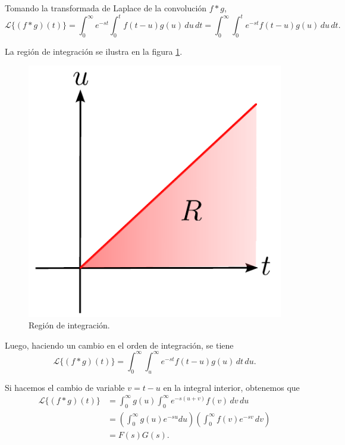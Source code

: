 \begin{demo}

Tomando la transformada de Laplace de la convolución $f * g$,
$$\mathcal{L}\{(f*g)(t)\} = \int_0^{\infty} e^{-st} \int_0^t f(t-u) g(u) \,du \,dt = \int_0^{\infty} \int_0^t e^{-st}  f(t-u) g(u) \,du \,dt.$$

La región de integración se ilustra en la figura \ref{fig:Convolucion2}.

\begin{figure}[H]
    \centering
    \includegraphics[scale = 0.6]{Figuras/Laplace-Convolucion-2.pdf}
    \caption{Región de integración.}
    \label{fig:Convolucion2}
\end{figure}

Luego, haciendo un cambio en el orden de integración, se tiene
$$\mathcal{L}\{(f*g)(t)\} = \int_0^{\infty} \int_u^{\infty} e^{-st} f(t-u) g(u) \,dt\,du.$$

Si hacemos el cambio de variable $v = t-u$ en la integral interior, obtenemos que
\begin{align*}
    \mathcal{L}\{(f*g)(t)\} &= \int_0^{\infty} g(u) \int_0^{\infty} e^{-s(u+v)} f(v) \,dv \,du \\
    &= \left(\int_0^{\infty} g(u) e^{-su} du \right)\left(\int_0^{\infty} f(v) e^{-sv} \,dv  \right) \\
    &= F(s)G(s). 
\end{align*}

\end{demo}

